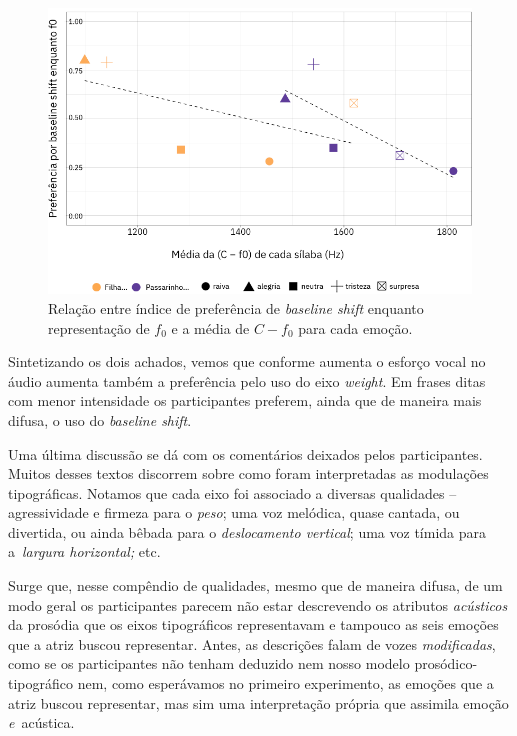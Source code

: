 \documentclass[a4paper]{tufte-handout}
\begin{document}
\begin{figure}
  \includegraphics{imgs/baseline_shift--f0.png}
  \caption{Relação entre índice de preferência de \textit{baseline shift} enquanto representação de $f_0$ e a média de $C-f_0$ para cada emoção.}
  \label{baseline_shift_as_f0}
\end{figure}

Sintetizando os dois achados, vemos que conforme aumenta o esforço vocal no áudio aumenta também a preferência pelo uso do eixo \textit{weight}. Em frases ditas com menor intensidade os participantes preferem, ainda que de maneira mais difusa, o uso do \textit{baseline shift}.

Uma última discussão se dá com os comentários deixados pelos participantes. Muitos desses textos discorrem sobre como foram interpretadas as modulações tipográficas. Notamos que cada eixo foi associado a diversas qualidades -- agressividade e firmeza para o \textit{peso}; uma voz melódica, quase cantada, ou divertida, ou ainda bêbada para o \textit{deslocamento vertical}; uma voz tímida para a~\textit{largura horizontal;} etc. 

Surge que, nesse compêndio de qualidades, mesmo que de maneira difusa, de um modo geral os participantes parecem não estar descrevendo os atributos \textit{acústicos} da prosódia que os eixos tipográficos representavam e tampouco as seis emoções que a atriz buscou representar. Antes, as descrições falam de vozes \textit{modificadas}, como se os participantes não tenham deduzido nem nosso modelo prosódico-tipográfico nem, como esperávamos no primeiro experimento, as emoções que a atriz buscou representar, mas sim uma interpretação própria que assimila emoção \textit{e}~acústica.
\end{document}
